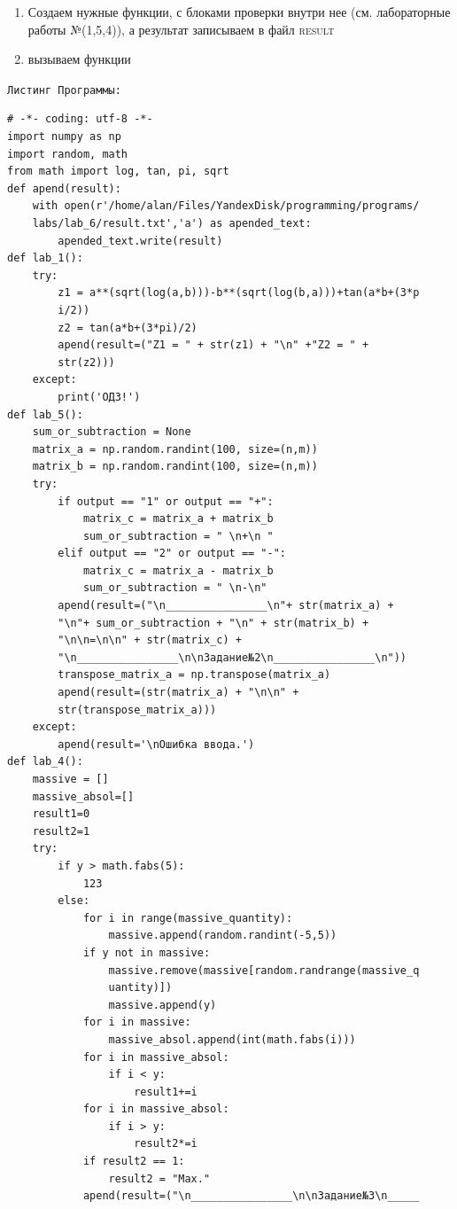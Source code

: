 \documentclass[a4paper]{article}
\begin{document}
\begin{lab1}
\begin{algoritm}
\begin{enumerate}
            \item Создаем нужные функции, с блоками проверки внутри нее (см. лабораторные работы №(1,5,4)), а результат записываем в файл \textsc{result}
            \item вызываем функции
        \end{enumerate}
    \end{algoritm}
        \texttt{Листинг Программы:}
    \begin{verbatim}
# -*- coding: utf-8 -*-
import numpy as np
import random, math
from math import log, tan, pi, sqrt
def apend(result):
    with open(r'/home/alan/Files/YandexDisk/programming/programs/
    labs/lab_6/result.txt','a') as apended_text:
        apended_text.write(result)
def lab_1():
    try:
        z1 = a**(sqrt(log(a,b)))-b**(sqrt(log(b,a)))+tan(a*b+(3*p
        i/2))
        z2 = tan(a*b+(3*pi)/2)
        apend(result=("Z1 = " + str(z1) + "\n" +"Z2 = " +
        str(z2)))
    except:
        print('ОДЗ!')
def lab_5():
    sum_or_subtraction = None
    matrix_a = np.random.randint(100, size=(n,m))
    matrix_b = np.random.randint(100, size=(n,m))
    try:
        if output == "1" or output == "+":
            matrix_c = matrix_a + matrix_b
            sum_or_subtraction = " \n+\n "
        elif output == "2" or output == "-":
            matrix_c = matrix_a - matrix_b
            sum_or_subtraction = " \n-\n"
        apend(result=("\n________________\n"+ str(matrix_a) + 
        "\n"+ sum_or_subtraction + "\n" + str(matrix_b) + 
        "\n\n=\n\n" + str(matrix_c) + 
        "\n________________\n\nЗадание№2\n________________\n"))
        transpose_matrix_a = np.transpose(matrix_a)
        apend(result=(str(matrix_a) + "\n\n" + 
        str(transpose_matrix_a)))
    except:
        apend(result='\nОшибка ввода.')
def lab_4():
    massive = []
    massive_absol=[]
    result1=0
    result2=1
    try:
        if y > math.fabs(5):
            123
        else:
            for i in range(massive_quantity):
                massive.append(random.randint(-5,5))
            if y not in massive:
                massive.remove(massive[random.randrange(massive_q
                uantity)])
                massive.append(y)
            for i in massive:
                massive_absol.append(int(math.fabs(i)))
            for i in massive_absol:
                if i < y:
                    result1+=i
            for i in massive_absol:
                if i > y:
                    result2*=i
            if result2 == 1:
                result2 = "Max."
            apend(result=("\n________________\n\nЗадание№3\n_____

\end{verbatim}
\end{lab1}
\end{document}
